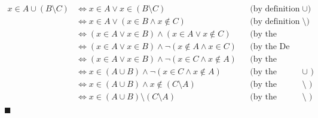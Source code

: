 \documentclass{scrartcl}
\begin{document}
    \begin{align*}
        x \in A \cup (B \setminus C)
        &\Leftrightarrow x \in A \vee x \in (B \setminus C)
        && \text{(by definition of $\cup$)} \\
        &\Leftrightarrow x \in A \vee (x \in B \wedge x \notin C)
        && \text{(by definition of $\setminus$)} \\
        &\Leftrightarrow (x \in A \vee x \in B) \wedge (x \in A \vee x \notin C)
        && \text{(by the Distributive Law )} \\
        &\Leftrightarrow (x \in A \vee x \in B) \wedge \neg (x \notin A \wedge x \in C)
        && \text{(by the De Morgan Law )} \\
        &\Leftrightarrow (x \in A \vee x \in B) \wedge \neg (x \in C \wedge x \notin A)
        && \text{(by the Commutative Law )} \\
        &\Leftrightarrow x \in (A \cup B) \wedge \neg (x \in C \wedge x \notin A)
        && \text{(by the definition of $\cup$ )} \\
        &\Leftrightarrow x \in (A \cup B) \wedge x \notin (C \setminus A)
        && \text{(by the definition of $\setminus$ )} \\
        &\Leftrightarrow x \in (A \cup B) \setminus (C \setminus A)
        && \text{(by the definition of $\setminus$ )} \\
    \end{align*}
    \hfill $\blacksquare$
\end{document}
